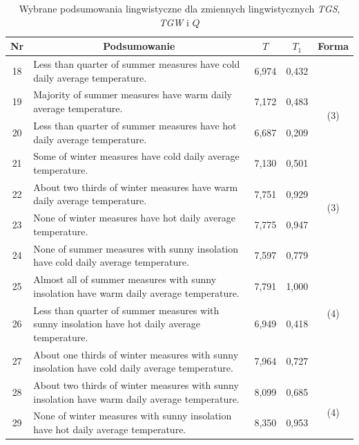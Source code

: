 \documentclass{classrep}
\begin{document}
\begin{table}[H]
\begin{center}
\begin{tabularx}{\linewidth}{ |c|X|c|c|c| } 
\hline
Nr & \multicolumn{1}{|c|}{Podsumowanie} & $T$ & $T_1$ & Forma \\
\hline
18	&	Less than quarter of summer measures have cold daily average temperature.	&	6,974	&	0,432	& \multirow{3}{1em}{\newline\newline(3)} \\ \cline{1-4}
19	&	Majority of summer measures have warm daily average temperature.	&	7,172	&	0,483	& \\	\cline{1-4}
20	&	Less than quarter of summer measures have hot daily average temperature.	&	6,687	&	0,209	& \\	\hline\hline
21	&	Some of winter measures have cold daily average temperature.	&	7,130	&	0,501 & \multirow{3}{1em}{\newline\newline(3)} \\ \cline{1-4}	
22	&	About two thirds of winter measures have warm daily average temperature.	&	7,751	&	0,929	& \\	\cline{1-4}
23	&	None of winter measures have hot daily average temperature.	&	7,775	&	0,947	& \\	\hline\hline

24	&	None of summer measures with sunny insolation have cold daily average temperature.	&	7,597	&	0,779  & \multirow{3}{1em}{\newline\newline\newline(4)} \\ \cline{1-4}			
25    &	Almost all of summer measures with sunny insolation have warm daily average temperature.	&	7,791	&	1,000	& \\	\cline{1-4}
26	&	Less than quarter of summer measures with sunny insolation have hot daily average temperature.	&	6,949	&	0,418	& \\	\hline\hline

27	&	About one thirds of winter measures with sunny insolation have cold daily average temperature.	&	7,964	&	0,727 & \multirow{3}{1em}{\newline\newline\newline(4)} \\ \cline{1-4}	
28	&	About two thirds of winter measures with sunny insolation have warm daily average temperature.	&	8,099	&	0,685	& \\	\cline{1-4}
29	&	None of winter measures with sunny insolation have hot daily average temperature.	&	8,350	&	0,953	& \\ \hline

\end{tabularx}
\caption{Wybrane podsumowania lingwistyczne dla zmiennych lingwistycznych \textit{TGS}, \textit{TGW} i $Q$}
\end{center}
\end{table}
\end{document}
